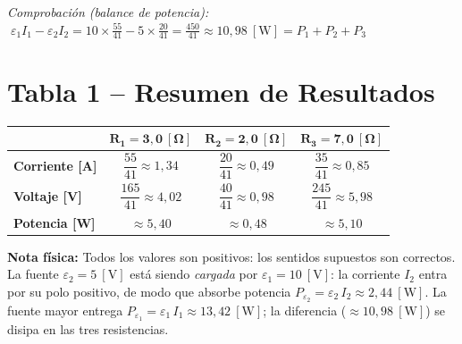\documentclass[12pt,letterpaper]{article}
\begin{document}
\noindent\small\textit{Comprobaci\'on (balance de potencia):}
$\;\varepsilon_1 I_1 - \varepsilon_2 I_2
  = 10\times\tfrac{55}{41} - 5\times\tfrac{20}{41}
  = \tfrac{450}{41} \approx 10{,}98\ [\text{W}]
  = P_1 + P_2 + P_3$\ \checkmark
\normalsize

\section*{Tabla 1 -- Resumen de Resultados}

{\renewcommand{\arraystretch}{1.7}
\begin{center}
\begin{tabular}{|l|c|c|c|}
\hline
 & $\boldsymbol{R_1 = 3{,}0\ [\Omega]}$
 & $\boldsymbol{R_2 = 2{,}0\ [\Omega]}$
 & $\boldsymbol{R_3 = 7{,}0\ [\Omega]}$ \\
\hline
\textbf{Corriente [A]}
    & $\dfrac{55}{41} \approx 1{,}34$
    & $\dfrac{20}{41} \approx 0{,}49$
    & $\dfrac{35}{41} \approx 0{,}85$ \\
\hline
\textbf{Voltaje [V]}
    & $\dfrac{165}{41} \approx 4{,}02$
    & $\dfrac{40}{41}  \approx 0{,}98$
    & $\dfrac{245}{41} \approx 5{,}98$ \\
\hline
\textbf{Potencia [W]}
    & $\approx 5{,}40$
    & $\approx 0{,}48$
    & $\approx 5{,}10$ \\
\hline
\end{tabular}
\end{center}}

\medskip
\noindent\textbf{Nota f\'isica:} Todos los valores son positivos: los sentidos supuestos
son correctos. La fuente \textcolor{colE2}{$\varepsilon_2 = 5\ [\text{V}]$} est\'a siendo
\emph{cargada} por \textcolor{colE1}{$\varepsilon_1 = 10\ [\text{V}]$}: la corriente $I_2$
entra por su polo positivo, de modo que absorbe potencia
$P_{\varepsilon_2} = \varepsilon_2\,I_2 \approx 2{,}44\ [\text{W}]$.
La fuente mayor entrega $P_{\varepsilon_1} = \varepsilon_1\,I_1 \approx 13{,}42\ [\text{W}]$;
la diferencia ($\approx 10{,}98\ [\text{W}]$) se disipa en las tres resistencias.
\end{document}

